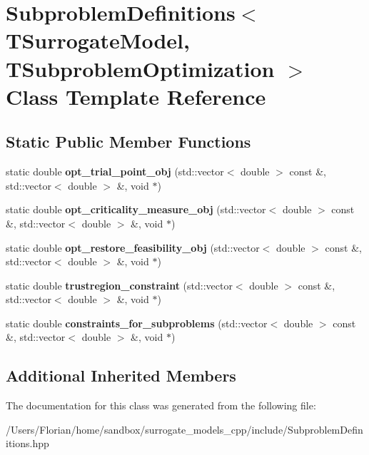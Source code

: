 \hypertarget{class_subproblem_definitions}{}\section{Subproblem\+Definitions$<$ T\+Surrogate\+Model, T\+Subproblem\+Optimization $>$ Class Template Reference}
\label{class_subproblem_definitions}
\subsection*{Static Public Member Functions}
\begin{DoxyCompactItemize}
\item 
static double {\bfseries opt\+\_\+trial\+\_\+point\+\_\+obj} (std\+::vector$<$ double $>$ const \&, std\+::vector$<$ double $>$ \&, void $\ast$)\hypertarget{class_subproblem_definitions_a50b06f2f0f31872aa06738c3f056f35b}{}\label{class_subproblem_definitions_a50b06f2f0f31872aa06738c3f056f35b}

\item 
static double {\bfseries opt\+\_\+criticality\+\_\+measure\+\_\+obj} (std\+::vector$<$ double $>$ const \&, std\+::vector$<$ double $>$ \&, void $\ast$)\hypertarget{class_subproblem_definitions_aa6b9952ca5f00c29ae5a90b0d8665526}{}\label{class_subproblem_definitions_aa6b9952ca5f00c29ae5a90b0d8665526}

\item 
static double {\bfseries opt\+\_\+restore\+\_\+feasibility\+\_\+obj} (std\+::vector$<$ double $>$ const \&, std\+::vector$<$ double $>$ \&, void $\ast$)\hypertarget{class_subproblem_definitions_ac1ba09eb224c4100e2f5bd984f4d2f9b}{}\label{class_subproblem_definitions_ac1ba09eb224c4100e2f5bd984f4d2f9b}

\item 
static double {\bfseries trustregion\+\_\+constraint} (std\+::vector$<$ double $>$ const \&, std\+::vector$<$ double $>$ \&, void $\ast$)\hypertarget{class_subproblem_definitions_a4f5a04c2e26502a4153d1c89df9b60bc}{}\label{class_subproblem_definitions_a4f5a04c2e26502a4153d1c89df9b60bc}

\item 
static double {\bfseries constraints\+\_\+for\+\_\+subproblems} (std\+::vector$<$ double $>$ const \&, std\+::vector$<$ double $>$ \&, void $\ast$)\hypertarget{class_subproblem_definitions_a2dfe4f5d863ef7dfe141cf4ad3563bc8}{}\label{class_subproblem_definitions_a2dfe4f5d863ef7dfe141cf4ad3563bc8}

\end{DoxyCompactItemize}
\subsection*{Additional Inherited Members}


The documentation for this class was generated from the following file\+:\begin{DoxyCompactItemize}
\item 
/\+Users/\+Florian/home/sandbox/surrogate\+\_\+models\+\_\+cpp/include/Subproblem\+Definitions.\+hpp\end{DoxyCompactItemize}
